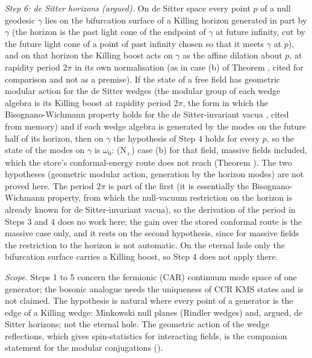 \emph{Step 6: de Sitter horizons (argued).} On de Sitter space every point $p$ of a null geodesic $\gamma$ lies on the bifurcation surface of a Killing horizon generated in part by $\gamma$ (the horizon is the past light cone of the endpoint of $\gamma$ at future infinity, cut by the future light cone of a point of past infinity chosen so that it meets $\gamma$ at $p$), and on that horizon the Killing boost acts on $\gamma$ as the affine dilation about $p$, at rapidity period $2\pi$ in its own normalisation (as in case (b) of Theorem , cited for comparison and not as a premise). If the state of a free field has geometric modular action for the de Sitter wedges (the modular group of each wedge algebra is its Killing boost at rapidity period $2\pi$, the form in which the Bisognano-Wichmann property holds for the de Sitter-invariant vacua \cite{BorchersBuchholz1999}, cited from memory) and if each wedge algebra is generated by the modes on the future half of its horizon, then on $\gamma$ the hypothesis of Step 4 holds for every $p$, so the state of the modes on $\gamma$ is $\omega_{0}$: (N$_{+}$) case (b) for that field, massive fields included, which the store's conformal-energy route does not reach (Theorem ). The two hypotheses (geometric modular action, generation by the horizon modes) are not proved here. The period $2\pi$ is part of the first (it is essentially the Bisognano-Wichmann property, from which the null-vacuum restriction on the horizon is already known for de Sitter-invariant vacua), so the derivation of the period in Steps 3 and 4 does no work here; the gain over the stored conformal route is the massive case only, and it rests on the second hypothesis, since for massive fields the restriction to the horizon is not automatic. On the eternal hole only the bifurcation surface carries a Killing boost, so Step 4 does not apply there.

\emph{Scope.} Steps 1 to 5 concern the fermionic (CAR) continuum mode space of one generator; the bosonic analogue needs the uniqueness of CCR KMS states and is not claimed. The hypothesis is natural where every point of a generator is the edge of a Killing wedge: Minkowski null planes (Rindler wedges) and, argued, de Sitter horizons; not the eternal hole. The geometric action of the wedge reflections, which gives spin-statistics for interacting fields, is the companion statement for the modular conjugations ().

